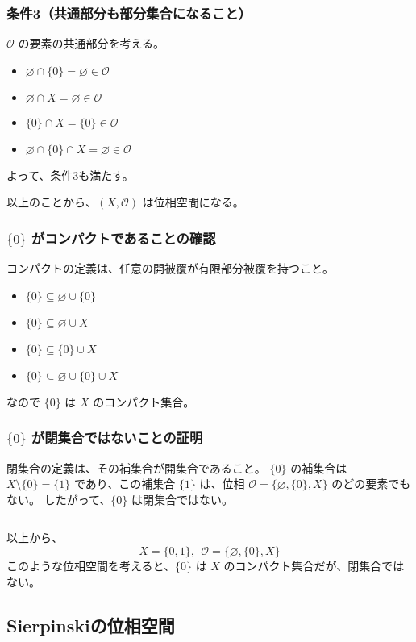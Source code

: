 \documentclass[uplatex,a4j,12pt,dvipdfmx]{jsarticle}
\begin{document}
\subsubsection{条件3（共通部分も部分集合になること）}
$\mathcal{O}$ の要素の共通部分を考える。
\begin{itemize}
	\item $\varnothing \cap \{0\} = \varnothing \in \mathcal{O}$
	\item $\varnothing \cap X = \varnothing \in \mathcal{O}$
	\item $\{0\} \cap X = \{0\} \in \mathcal{O}$
	\item $\varnothing \cap \{0\} \cap X = \varnothing \in \mathcal{O}$
\end{itemize}
よって、条件3も満たす。

以上のことから、$(X, \mathcal{O})$ は位相空間になる。

\subsubsection{$\{0\}$ がコンパクトであることの確認}
コンパクトの定義は、任意の開被覆が有限部分被覆を持つこと。
\begin{itemize}
	\item $ \{ 0\} \subseteq \varnothing \cup \{ 0 \}$
	\item $ \{ 0\} \subseteq \varnothing \cup X$
	\item $ \{ 0\} \subseteq \{ 0 \} \cup X$
	\item $ \{ 0\} \subseteq \varnothing \cup \{ 0 \} \cup X$
\end{itemize}

なので $\{ 0\}$ は $X$ のコンパクト集合。


\subsubsection{$\{0\}$ が閉集合ではないことの証明}

閉集合の定義は、その補集合が開集合であること。
$\{0\}$ の補集合は $X \setminus \{0\} = \{1\}$ であり、この補集合 $\{1\}$ は、位相 $\mathcal{O} = \{\varnothing, \{0\}, X\}$ のどの要素でもない。
したがって、$\{0\}$ は閉集合ではない。

${}$

以上から、
$$X = \{0, 1\} , \  \ \mathcal{O} = \{\varnothing, \{0\}, X\}$$
このような位相空間を考えると、$\{0\}$ は $X$ のコンパクト集合だが、閉集合ではない。


\subsection{Sierpinskiの位相空間}
\end{document}
